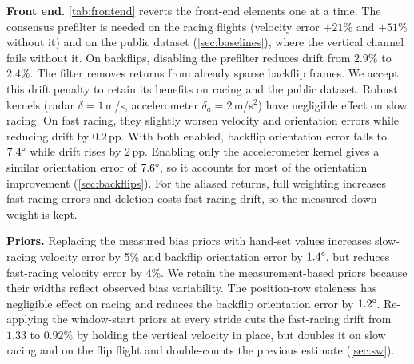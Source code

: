 \begin{table}[t]
\centering
\caption{Sensitivity to the law's noise floor $\sigma_0$ (live edge:
  velocity / orientation / drift)}
\label{tab:s0ladder}
\footnotesize
\setlength{\tabcolsep}{3pt}
\end{table}

\textbf{Front end.}  \autoref{tab:frontend} reverts the front-end
elements one at a time.  The consensus prefilter is needed on the
racing flights (velocity error $+21\%$ and $+51\%$ without it) and on the
public dataset (\autoref{sec:baselines}), where the vertical channel
fails without it.  On backflips, disabling the prefilter reduces
drift from $2.9\%$ to $2.4\%$.  The filter removes returns from already
sparse backflip frames.  We accept this drift penalty to retain its
benefits on racing and the public dataset.
Robust kernels (radar $\delta = 1$\,m/s,
accelerometer $\delta_a = 2$\,m/s$^2$) have negligible effect on slow
racing.  On fast racing, they slightly worsen velocity and orientation
errors while reducing drift by $0.2$\,pp.  With both enabled,
backflip orientation error falls to $7.4\degree$ while drift rises
by $2$\,pp.  Enabling only the accelerometer kernel gives a similar
orientation error of $7.6\degree$, so it accounts for most of the
orientation improvement (\autoref{sec:backflips}).  For the
aliased returns, full weighting increases fast-racing errors and
deletion costs fast-racing drift, so the measured down-weight is kept.

\textbf{Priors.}  Replacing the measured bias priors with hand-set
values increases slow-racing velocity error by 5\% and backflip
orientation error by $1.4\degree$, but reduces fast-racing velocity
error by 4\%.  We retain the measurement-based priors because their
widths reflect observed bias variability.  The position-row staleness
has negligible effect on racing and reduces the backflip orientation error by
$1.2\degree$.  Re-applying the window-start priors at every stride
cuts the fast-racing drift from $1.33$ to $0.92\%$ by holding the
vertical velocity in place, but doubles it on slow racing and on the
flip flight and double-counts the previous estimate (\autoref{sec:sw}).

